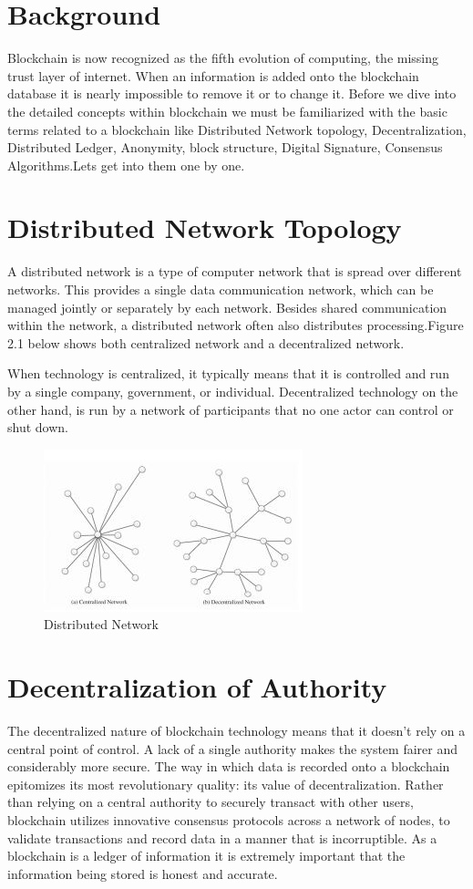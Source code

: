 \documentclass[12pt]{report}
\begin{document}
\section{Background}
\par Blockchain is now recognized as the fifth evolution of computing, the missing trust layer of internet. When an information is added onto the blockchain database it is nearly impossible to remove it or to change it. Before we dive into the detailed concepts within blockchain we must be familiarized with the basic terms related to a blockchain like Distributed Network topology, Decentralization, Distributed Ledger, Anonymity, block structure, Digital Signature, Consensus Algorithms.Lets get into them one by one. 
\section{Distributed Network Topology}
\par A distributed network is a type of computer network that is spread over different networks. This provides a single data communication network, which can be managed jointly or separately by each network. Besides shared communication within the network, a distributed network often also distributes processing.Figure 2.1  below shows both centralized network and a decentralized network.


\par When technology is centralized, it typically means that it is controlled and run by a single company, government, or individual. Decentralized technology on the other hand, is run by a network of participants that no one actor can control or shut down.
\begin{figure}
    \centering
    \includegraphics{Blockchain-3.JPG}
    \caption{Distributed Network}
    \label{fig:1}
\end{figure}
\section{Decentralization of Authority}
\par The decentralized nature of blockchain technology means that it doesn’t rely on a central point of control. A lack of a single authority makes the system fairer and considerably more secure. The way in which data is recorded onto a blockchain epitomizes its most revolutionary quality: its value of decentralization. Rather than relying on a central authority to securely transact with other users, blockchain utilizes innovative consensus protocols across a network of nodes, to validate transactions and record data in a manner that is incorruptible. As a blockchain is a ledger of information it is extremely important that the information being stored is honest and accurate.
\end{document}
